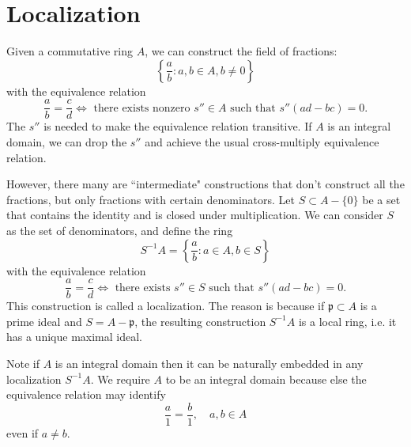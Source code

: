\section{Localization}
Given a commutative ring $A$, we can construct the field of fractions:
\[
    \left\{ \frac{a}{b} : a, b \in A, b \neq 0\right\}
\]
with the equivalence relation
\[
    \frac{a}{b} = \frac{c}{d} \iff \text{ there exists nonzero $s'' \in A$ such that } s''(ad - bc) = 0.
\]
The $s''$ is needed to make the equivalence relation transitive. If $A$ is an integral domain, we can drop the $s''$ and achieve the usual cross-multiply equivalence relation.

However, there many are ``intermediate" constructions that don't construct all the fractions, but only fractions with certain denominators. Let $S \subset A - \{0\}$ be a set that contains the identity and is closed under multiplication. We can consider $S$ as the set of denominators, and define the ring
\[
    S^{-1}A = \left\{ \frac{a}{b} : a \in A, b \in S \right\}
\]
with the equivalence relation
\[
    \frac{a}{b} = \frac{c}{d} \iff \text{ there exists $s'' \in S$ such that } s''(ad - bc) = 0.
\]
This construction is called a localization. The reason is because if $\mathfrak p \subset A$ is a prime ideal and $S = A - \mathfrak p$, the resulting construction $S^{-1}A$ is a local ring, i.e. it has a unique maximal ideal.

Note if $A$ is an integral domain then it can be naturally embedded in any localization $S^{-1}A$. We require $A$ to be an integral domain because else the equivalence relation may identify
\[
    \frac{a}{1} = \frac{b}{1}, \quad a,b \in A
\]
even if $a \neq b$.
